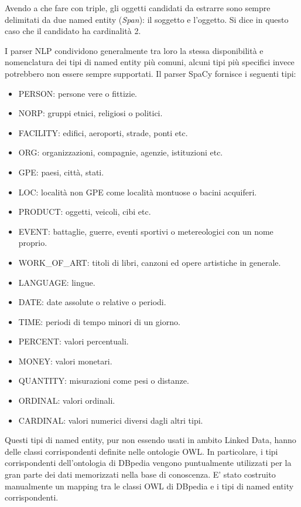 Avendo a che fare con triple, gli oggetti candidati da estrarre sono sempre delimitati da due named entity (\textit{Span}): il soggetto e l'oggetto. Si dice in questo caso che il candidato ha cardinalità 2.

I parser NLP condividono generalmente tra loro la stessa disponibilità e nomenclatura dei tipi di named entity più comuni, alcuni tipi più specifici invece potrebbero non essere sempre supportati. Il parser SpaCy fornisce i seguenti tipi:
\begin{itemize}
\item PERSON: persone vere o fittizie.
\item NORP: gruppi etnici, religiosi o politici.
\item FACILITY: edifici, aeroporti, strade, ponti etc.
\item ORG: organizzazioni, compagnie, agenzie, istituzioni etc.
\item GPE: paesi, città, stati.
\item LOC: località non GPE come località montuose o bacini acquiferi.	   \item PRODUCT: oggetti, veicoli, cibi etc.    
\item EVENT: battaglie, guerre, eventi sportivi o metereologici con un nome proprio.
\item WORK\_OF\_ART: titoli di libri, canzoni ed opere artistiche in generale.
\item LANGUAGE:	lingue.
\item DATE: date assolute o relative o periodi.
\item TIME: periodi di tempo minori di un giorno.	
\item PERCENT: valori percentuali.
\item MONEY: valori monetari.  
\item QUANTITY:	misurazioni come pesi o distanze.
\item ORDINAL: valori ordinali.
\item CARDINAL:	valori numerici diversi dagli altri tipi.
\end{itemize}

Questi tipi di named entity, pur non essendo usati in ambito Linked Data, hanno delle classi corrispondenti definite nelle ontologie OWL. In particolare, i tipi corrispondenti dell'ontologia di DBpedia vengono puntualmente utilizzati per la gran parte dei dati memorizzati nella base di conoscenza. E' stato costruito manualmente un mapping tra le classi OWL di DBpedia e i tipi di named entity corrispondenti.

